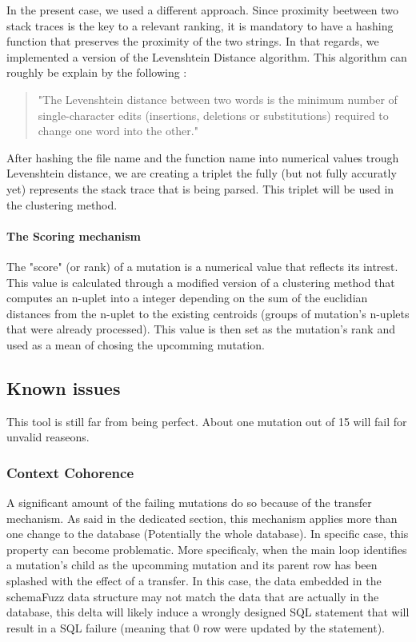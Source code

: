 \documentclass{article}
\begin{document}
In the present case, we used a different approach. Since proximity beetween two stack traces is the key to a relevant ranking, it is mandatory to have a hashing function that preserves the proximity of the two strings. 
In that regards, we implemented a version of the Levenshtein Distance algorithm.
This algorithm can roughly be explain by the following :
				\begin{quotation}
"The Levenshtein distance between two words is the minimum number of single-character edits (insertions, deletions or substitutions) required to change one word into the other."
				\end{quotation}				 
After hashing the file name and the function name into numerical values trough Levenshtein distance, we are creating a triplet the fully (but not fully accuratly yet) represents the stack trace that is being parsed. This triplet will be used in the clustering method. %

				\paragraph{The Scoring mechanism}
The "score" (or rank) of a mutation is a numerical value that reflects its intrest. This value is calculated through a modified version of a clustering method that computes an n-uplet 			into a integer depending on the sum of the euclidian distances from the n-uplet to the existing centroids (groups of mutation's n-uplets that were already processed).
This value is then set as the mutation's rank and used as a mean of chosing the upcomming mutation.
		\subsection{Known issues}		
This tool is still far from being perfect. About one mutation out of 15 will fail for unvalid reaseons.
			\subsubsection{Context Cohorence}
A significant amount of the failing mutations do so because of the transfer mechanism. As said in the dedicated section, this mechanism applies more than one change to the database (Potentially the whole database). In specific case, this property can become problematic. 
More specificaly, when the main loop identifies a mutation's child as the upcomming mutation and its parent row has been splashed with the effect of a transfer. In this case, the data embedded in the schemaFuzz data structure may not match the data that are actually in the database, this delta will likely induce a wrongly designed SQL statement that will result in a SQL failure (meaning that 0 row were updated by the statement).
\end{document}
